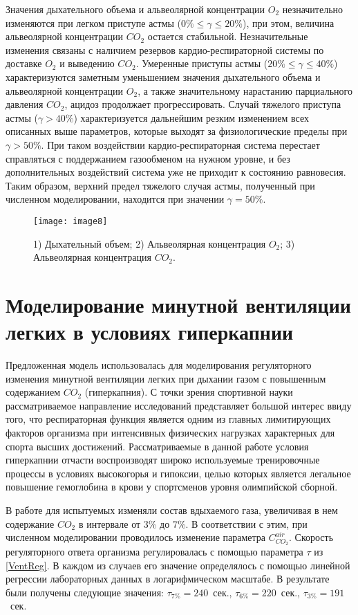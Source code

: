 Значения дыхательного объема и альвеолярной концентрации $O_{2} $ незначительно изменяются при легком приступе астмы ($0\% \le \gamma \le 20\% $), при этом, величина альвеолярной концентрации $CO_{2} $ остается стабильной. Незначительные изменения связаны с наличием резервов кардио-респираторной системы по доставке  $O_{2} $ и выведению  $CO_{2} $. Умеренные приступы астмы ($20\% \le \gamma \le 40\% $) характеризуются заметным уменьшением значения дыхательного объема и альвеолярной концентрации $O_{2} $, а также значительному нарастанию парциального давления $CO_{2} $, ацидоз продолжает прогрессировать. Случай тяжелого приступа астмы ($\gamma >40\% $) характеризуется дальнейшим резким изменением всех описанных выше параметров, которые выходят за физиологические пределы при $\gamma >50\% $. При таком воздействии кардио-респираторная система перестает справляться с поддержанием газообменом на нужном уровне, и без дополнительных воздействий система уже не приходит к состоянию равновесия. Таким образом, верхний предел тяжелого случая астмы, полученный при численном моделировании, находится при значении $\gamma =50\% $.
 
\begin{figure}[!ht]
	\centering
	\texttt{[image: image8]}
	\caption{1) Дыхательный объем; 2) Альвеолярная концентрация $O_{2} $; 3) Альвеолярная концентрация $CO_{2} $.} 
	\label{image8}
\end{figure}

\section{Моделирование минутной вентиляции легких в условиях гиперкапнии}
Предложенная модель использовалась для моделирования регуляторного изменения минутной вентиляции легких при дыхании газом с повышенным содержанием $CO_2$ (гиперкапния). С точки зрения спортивной науки рассматриваемое направление исследований представляет большой интерес ввиду того, что респираторная функция является одним из главных лимитирующих факторов организма при интенсивных физических нагрузках характерных для спорта высших достижений. Рассматриваемые в данной работе условия гиперкапнии отчасти воспроизводят широко используемые тренировочные процессы в условиях высокогорья и гипоксии, целью которых является легальное повышение гемоглобина в крови у спортсменов уровня олимпийской сборной.

В работе \cite{reynolds1972} для испытуемых изменяли состав вдыхаемого газа, увеличивая в нем содержание \(CO_{2}\) в интервале от 3\% до 7\%. В соответствии с этим, при численном моделировании проводилось изменение параметра \(C_{CO_{2}}^{air}\). Скорость регуляторного ответа организма регулировалась с помощью параметра \(\tau\) из \eqref{VentReg}. В каждом из случаев его значение 
определялось с помощью линейной регрессии лабораторных данных в логарифмическом масштабе. В результате были получены следующие значения: $\tau_{7\%}=240$~сек., $\tau_{6\%}=220$~сек., $\tau_{3\%}=191$~сек.  


